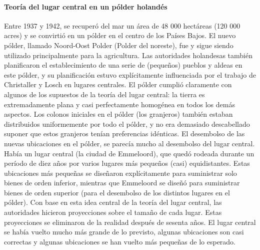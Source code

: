 \paragraph{Teoría del lugar central en un pólder holandés}
Entre 1937 y 1942, se recuperó del mar un área de 48 000 hectáreas (120 000 acres) y se convirtió en un pólder en el centro de los Países Bajos. El nuevo pólder, llamado Noord-Oost Polder (Polder del noreste), fue y sigue siendo utilizado principalmente para la agricultura. Las autoridades holandesas también planificaron el establecimiento de una serie de (pequeños) pueblos y aldeas en este pólder, y su planificación estuvo explícitamente influenciada por el trabajo de Christaller y Losch en lugares centrales. El pólder cumplió claramente con algunos de los supuestos de la teoría del lugar central: la tierra es extremadamente plana y casi perfectamente homogénea en todos los demás aspectos. Los colonos iniciales en el pólder (los granjeros) también estaban distribuidos uniformemente por todo el pólder, y no era demasiado descabellado suponer que estos granjeros tenían preferencias idénticas. El desembolso de las nuevas ubicaciones en el pólder, se parecía mucho al desembolso del lugar central. Había un lugar central (la ciudad de Emmeloord), que quedó rodeada durante un período de diez años por varios lugares más pequeños (casi) equidistantes. Estas ubicaciones más pequeñas se diseñaron explícitamente para suministrar solo bienes de orden inferior, mientras que Emmeloord se diseñó para suministrar  bienes de orden superior (para el desembolso de los distintos lugares en el pólder). Con base en esta idea central de la teoría del lugar central, las autoridades hicieron proyecciones sobre el tamaño de cada lugar. Estas proyecciones se eliminaron de la realidad después de sesenta años. El lugar central se había vuelto mucho más grande de lo previsto, algunas ubicaciones son casi correctas y algunas ubicaciones se han vuelto más pequeñas de lo esperado. 

